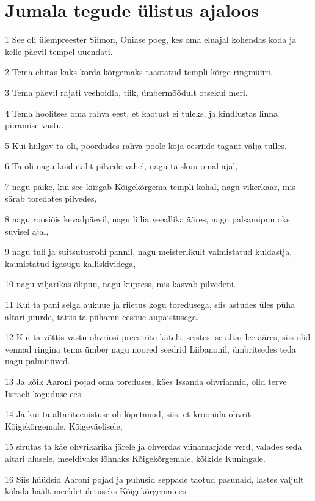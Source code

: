 \section*{Jumala tegude ülistus ajaloos}

\par 1 See oli ülempreester Siimon, Oniase poeg, kes oma eluajal kohendas koda ja kelle päevil tempel uuendati.
\par 2 Tema ehitas kaks korda kõrgemaks taastatud templi kõrge ringmüüri.
\par 3 Tema päevil rajati veehoidla, tiik, ümbermõõdult otsekui meri.
\par 4 Tema hoolitses oma rahva eest, et kaotust ei tuleks, ja kindlustas linna piiramise vastu.
\par 5 Kui hiilgav ta oli, pöördudes rahva poole koja eesriide tagant välja tulles.
\par 6 Ta oli nagu koidutäht pilvede vahel, nagu täiskuu omal ajal,
\par 7 nagu päike, kui see kiirgab Kõigekõrgema templi kohal, nagu vikerkaar, mis särab toredates pilvedes,
\par 8 nagu roosiõis kevadpäevil, nagu liilia veeallika ääres, nagu palsamipuu oks suvisel ajal,
\par 9 nagu tuli ja suitsutusrohi pannil, nagu meisterlikult valmistatud kuldastja, kaunistatud igasugu kalliskividega,
\par 10 nagu viljarikas õlipuu, nagu küpress, mis kasvab pilvedeni.
\par 11 Kui ta pani selga aukuue ja riietus kogu toredusega, siis astudes üles püha altari juurde, täitis ta pühamu eesõue aupaistusega.
\par 12 Kui ta võttis vastu ohvriosi preestrite kätelt, seistes ise altarilee ääres, siis olid vennad ringina tema ümber nagu noored seedrid Liibanonil, ümbritsedes teda nagu palmitüved.
\par 13 Ja kõik Aaroni pojad oma toreduses, käes Issanda ohvriannid, olid terve Iisraeli koguduse ees.
\par 14 Ja kui ta altariteenistuse oli lõpetanud, siis, et kroonida ohvrit Kõigekõrgemale, Kõigeväelisele,
\par 15 sirutas ta käe ohvrikarika järele ja ohverdas viinamarjade verd, valades seda altari alusele, meeldivaks lõhnaks Kõigekõrgemale, kõikide Kuningale.
\par 16 Siis hüüdsid Aaroni pojad ja puhusid seppade taotud pasunaid, lastes valjult kõlada häält meeldetuletuseks Kõigekõrgema ees.
